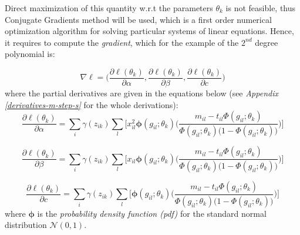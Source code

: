 Direct maximization of this quantity w.r.t the parameters $\theta_{k}$ is not feasible, thus Conjugate Gradients method \citep{Hestenes1952} will be used, which is a first order numerical optimization algorithm for solving particular systems of linear equations. Hence, it requires to compute the \emph{gradient}, which for the example of the $2^{nd}$ degree polynomial is:

\begin{equation} \label{gradient-f}
	\nabla\ell = \bigg( \frac{\partial \ell(\theta_{k})}{\partial \alpha}, \frac{\partial \ell(\theta_{k})}{\partial \beta}, \frac{\partial \ell(\theta_{k})}{\partial c}\bigg) 
\end{equation}
where the partial derivatives are given in the equations below (see \emph{Appendix \ref{derivatives-m-step-s}} for the whole derivations):
\begin{equation} \label{derivative-a-f}
	\frac{\partial \ell(\theta_{k})}{\partial \alpha} =  \sum_{i}  \gamma(z_{ik}) \sum_{l} \bigg[ x_{il}^{2} \mathbf{\phi}(g_{il};\theta_{k})\bigg(\frac{m_{il} - t_{il}\Phi(g_{il};\theta_{k})}{\Phi(g_{il};\theta_{k})\big(1-\Phi(g_{il};\theta_{k})\big)} \bigg) \bigg]
\end{equation}

\begin{equation} \label{derivative-b-f}
	\frac{\partial \ell(\theta_{k})}{\partial \beta} =  \sum_{i}  \gamma(z_{ik}) \sum_{l} \bigg[ x_{il} \mathbf{\phi}(g_{il};\theta_{k})\bigg(\frac{m_{il} - t_{il}\Phi(g_{il};\theta_{k})}{\Phi(g_{il};\theta_{k})\big(1-\Phi(g_{il};\theta_{k})\big)} \bigg) \bigg]
\end{equation}

\begin{equation} \label{derivative-c-f}
	\frac{\partial \ell(\theta_{k})}{\partial c} =  \sum_{i}  \gamma(z_{ik}) \sum_{l} \bigg[ \mathbf{\phi}(g_{il};\theta_{k})\bigg(\frac{m_{il} - t_{il}\Phi(g_{il};\theta_{k})}{\Phi(g_{il};\theta_{k})\big(1-\Phi(g_{il};\theta_{k})\big)} \bigg) \bigg]
\end{equation}
where $\mathbf{\phi}$ is the \emph{probability density function (pdf)} for the standard normal distribution $\mathcal{N}(0,1)$.